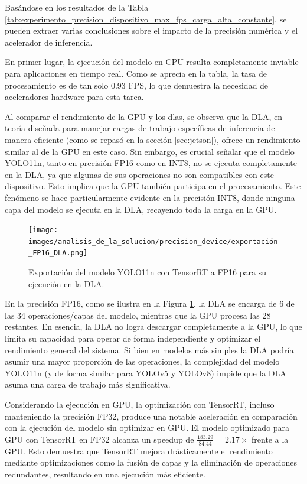 \documentclass[11pt,spanish,listoffigures,listoftables]{tfgetsinf}
\begin{document}
Basándose en los resultados de la Tabla \ref{tab:experimento_precision_dispositivo_max_fps_carga_alta_constante}, se pueden extraer varias conclusiones sobre el impacto de la precisión numérica y el acelerador de inferencia.

En primer lugar, la ejecución del modelo en CPU resulta completamente inviable para aplicaciones en tiempo real. Como se aprecia en la tabla, la tasa de procesamiento es de tan solo 0.93 FPS, lo que demuestra la necesidad de aceleradores hardware para esta tarea.

Al comparar el rendimiento de la GPU y los \glspl{dla}, se observa que la DLA, en teoría diseñada para manejar cargas de trabajo específicas de inferencia de manera eficiente (como se repasó en la sección \ref{sec:jetson}), ofrece un rendimiento similar al de la GPU en este caso. Sin embargo, es crucial señalar que el modelo YOLO11n, tanto en precisión FP16 como en INT8, no se ejecuta completamente en la DLA, ya que algunas de sus operaciones no son compatibles con este dispositivo. Esto implica que la GPU también participa en el procesamiento. Este fenómeno se hace particularmente evidente en la precisión INT8, donde ninguna capa del modelo se ejecuta en la DLA, recayendo toda la carga en la GPU.
\begin{figure}[H]
   \centering
   \texttt{[image: images/analisis\_de\_la\_solucion/precision\_device/exportación\_FP16\_DLA.png]}
   \caption[Exportación del modelo YOLO11n con TensorRT a FP16 para su ejecución en la DLA]{Exportación del modelo YOLO11n con TensorRT a FP16 para su ejecución en la DLA.}
   \label{fig:exportacion_FP16_DLA}
\end{figure}
En la precisión FP16, como se ilustra en la Figura \ref{fig:exportacion_FP16_DLA}, la DLA se encarga de 6 de las 34 operaciones/capas del modelo, mientras que la GPU procesa las 28 restantes. En esencia, la DLA no logra descargar completamente a la GPU, lo que limita su capacidad para operar de forma independiente y optimizar el rendimiento general del sistema. Si bien en modelos más simples la DLA podría asumir una mayor proporción de las operaciones, la complejidad del modelo YOLO11n (y de forma similar para YOLOv5 y YOLOv8) impide que la DLA asuma una carga de trabajo más significativa.

Considerando la ejecución en GPU, la optimización con TensorRT, incluso manteniendo la precisión FP32, produce una notable aceleración en comparación con la ejecución del modelo sin optimizar en GPU. El modelo optimizado para GPU con TensorRT en FP32 alcanza un speedup de $\frac{183.29}{84.44} = 2.17\times$ frente a la GPU. Esto demuestra que TensorRT mejora drásticamente el rendimiento mediante optimizaciones como la fusión de capas y la eliminación de operaciones redundantes, resultando en una ejecución más eficiente.
\end{document}
